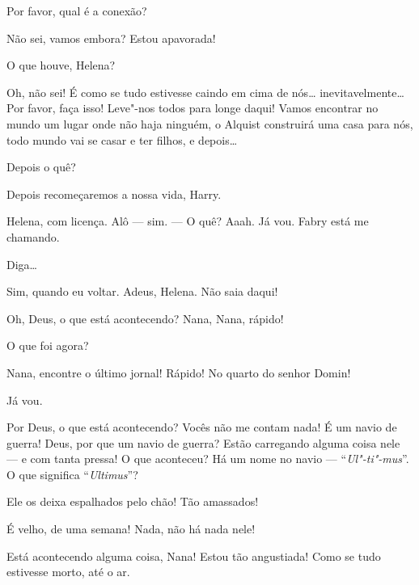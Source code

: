  Por favor, qual é a conexão?

 Não sei, vamos embora? Estou apavorada!

  O que houve, Helena?

 Oh, não sei! É como se tudo estivesse caindo em cima de nós\ldots{}
inevitavelmente\ldots{} Por favor, faça isso! Leve"-nos todos para longe daqui! Vamos
encontrar no mundo um lugar onde não haja ninguém, o Alquist construirá uma casa
para nós, todo mundo vai se casar e ter filhos, e depois\ldots{}

 Depois o quê?

 Depois recomeçaremos a nossa vida, Harry.

  Helena, com licença.  Alô
--- sim. --- O quê? Aaah. Já vou.  Fabry está me chamando.

  Diga\ldots{}

 Sim, quando eu voltar. Adeus, Helena.  Não saia daqui!

  Oh, Deus, o que está acontecendo? Nana, Nana, rápido!

  O que foi agora?

 Nana, encontre o último jornal! Rápido! No quarto do senhor Domin!

 Já vou. 

 Por Deus, o que está acontecendo? Vocês não me contam nada!  É um navio de guerra! Deus, por que um navio de
guerra? Estão carregando alguma coisa nele --- e com tanta pressa! O que
aconteceu? Há um nome no navio --- ``\textit{Ul"-ti"-mus}''. O que significa
``\textit{Ultimus}''?

  Ele os deixa espalhados pelo chão! Tão
amassados!

  É velho, de uma semana! Nada, não há
nada nele! 

 Está acontecendo alguma coisa, Nana! Estou tão angustiada! Como se tudo
estivesse morto, até o ar.

